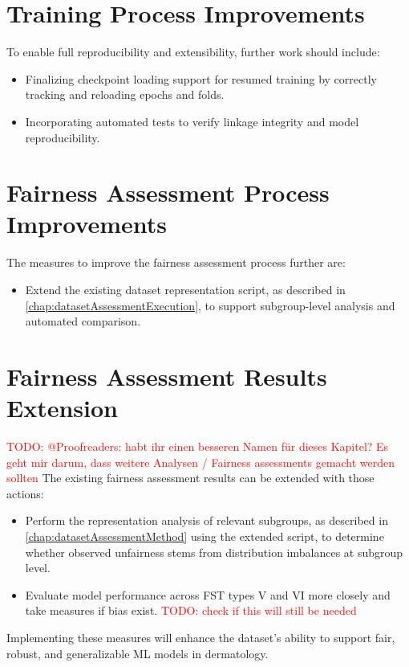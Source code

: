 \documentclass[12pt, a4paper, oneside]{book}   	%
\renewcommand{\todo}[1]{\textcolor{red}{TODO: #1}}
\begin{document}
		
		\section{Training Process Improvements}
		To enable full reproducibility and extensibility, further work should include:
		
		\begin{itemize}
			\item Finalizing checkpoint loading support for resumed training by correctly tracking and reloading epochs and folds.
			\item Incorporating automated tests to verify linkage integrity and model reproducibility.
		\end{itemize}
		
		
		\section{Fairness Assessment Process Improvements}
		The measures to improve the fairness assessment process further are:
		\begin{itemize}
			\item Extend the existing dataset representation script, as described in \autoref{chap:datasetAssessmentExecution}, to support subgroup-level analysis and automated comparison.
		\end{itemize}
		
		
		\section{Fairness Assessment Results Extension}
		\todo{@Proofreaders: habt ihr einen besseren Namen für dieses Kapitel? Es geht mir darum, dass weitere Analysen / Fairness assessments gemacht werden sollten}
		The existing fairness assessment results can be extended with those actions:
		\begin{itemize}
			\item Perform the representation analysis of relevant subgroups, as described in \autoref{chap:datasetAssessmentMethod} using the extended script, to determine whether observed unfairness stems from distribution imbalances at subgroup level.	
			
			\item Evaluate model performance across \gls{FST} types V and VI more closely and take measures if bias exist. \todo{check if this will still be needed}
		\end{itemize}
		
		
		Implementing these measures will enhance the dataset’s ability to support fair, robust, and generalizable \gls{ML} models in dermatology.
	
\end{document}
